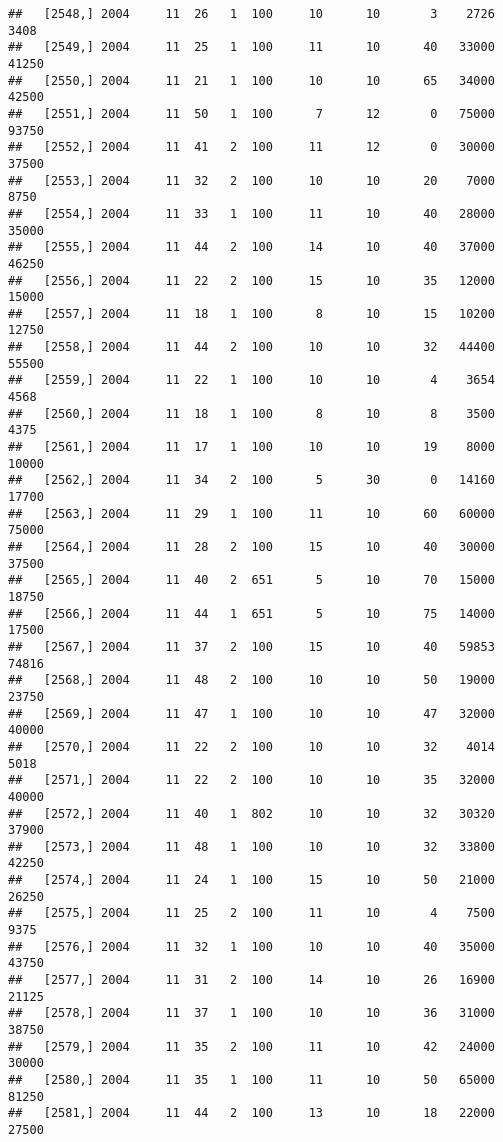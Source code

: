 \documentclass{article}\usepackage[]{graphicx}\usepackage[]{color}
\makeatletter
\newenvironment{kframe}{%
 \def\at@end@of@kframe{}%
 \ifinner\ifhmode%
  \def\at@end@of@kframe{\end{minipage}}%
  \begin{minipage}{\columnwidth}%
 \fi\fi%
 \def\FrameCommand##1{\hskip\@totalleftmargin \hskip-\fboxsep
 \colorbox{shadecolor}{##1}\hskip-\fboxsep
     \hskip-\linewidth \hskip-\@totalleftmargin \hskip\columnwidth}%
 \MakeFramed {\advance\hsize-\width
   \@totalleftmargin\z@ \linewidth\hsize
   \@setminipage}}%
 {\par\unskip\endMakeFramed%
 \at@end@of@kframe}
\newenvironment{knitrout}{}{} %
\makeatother
\begin{document}
\begin{knitrout}
\begin{kframe}
\begin{verbatim}
##   [2548,] 2004     11  26   1  100     10      10       3    2726    3408
##   [2549,] 2004     11  25   1  100     11      10      40   33000   41250
##   [2550,] 2004     11  21   1  100     10      10      65   34000   42500
##   [2551,] 2004     11  50   1  100      7      12       0   75000   93750
##   [2552,] 2004     11  41   2  100     11      12       0   30000   37500
##   [2553,] 2004     11  32   2  100     10      10      20    7000    8750
##   [2554,] 2004     11  33   1  100     11      10      40   28000   35000
##   [2555,] 2004     11  44   2  100     14      10      40   37000   46250
##   [2556,] 2004     11  22   2  100     15      10      35   12000   15000
##   [2557,] 2004     11  18   1  100      8      10      15   10200   12750
##   [2558,] 2004     11  44   2  100     10      10      32   44400   55500
##   [2559,] 2004     11  22   1  100     10      10       4    3654    4568
##   [2560,] 2004     11  18   1  100      8      10       8    3500    4375
##   [2561,] 2004     11  17   1  100     10      10      19    8000   10000
##   [2562,] 2004     11  34   2  100      5      30       0   14160   17700
##   [2563,] 2004     11  29   1  100     11      10      60   60000   75000
##   [2564,] 2004     11  28   2  100     15      10      40   30000   37500
##   [2565,] 2004     11  40   2  651      5      10      70   15000   18750
##   [2566,] 2004     11  44   1  651      5      10      75   14000   17500
##   [2567,] 2004     11  37   2  100     15      10      40   59853   74816
##   [2568,] 2004     11  48   2  100     10      10      50   19000   23750
##   [2569,] 2004     11  47   1  100     10      10      47   32000   40000
##   [2570,] 2004     11  22   2  100     10      10      32    4014    5018
##   [2571,] 2004     11  22   2  100     10      10      35   32000   40000
##   [2572,] 2004     11  40   1  802     10      10      32   30320   37900
##   [2573,] 2004     11  48   1  100     10      10      32   33800   42250
##   [2574,] 2004     11  24   1  100     15      10      50   21000   26250
##   [2575,] 2004     11  25   2  100     11      10       4    7500    9375
##   [2576,] 2004     11  32   1  100     10      10      40   35000   43750
##   [2577,] 2004     11  31   2  100     14      10      26   16900   21125
##   [2578,] 2004     11  37   1  100     10      10      36   31000   38750
##   [2579,] 2004     11  35   2  100     11      10      42   24000   30000
##   [2580,] 2004     11  35   1  100     11      10      50   65000   81250
##   [2581,] 2004     11  44   2  100     13      10      18   22000   27500

\end{verbatim}
\end{kframe}
\end{knitrout}
\end{document}
